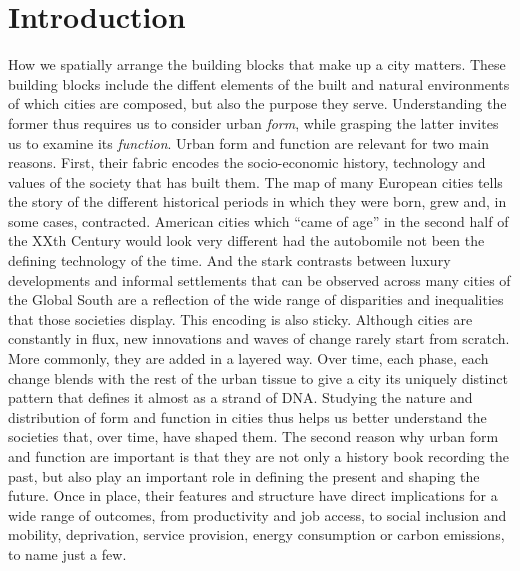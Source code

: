 \section{Introduction}
\label{sec:intro}

How we spatially arrange the building blocks that make up a city matters.
These building blocks include the diffent
elements of the built and natural environments of which cities are composed,
but also the purpose they serve.
Understanding the former thus requires us to consider urban \textit{form}, while
grasping the latter invites us to examine its \textit{function}.
Urban form and function are relevant for two main reasons. First, their fabric
encodes the socio-economic history, technology and values
of the society that has built them. 
%
The map of many European cities tells the story of the different historical
periods in which they were born, grew and, in some cases, contracted.
%
American cities which ``came of age'' in the second half of the XXth Century
would look very different had the autobomile not been the defining
technology of the time.
%
And the stark contrasts between luxury developments and informal settlements
that can be observed across many cities of the Global South are a reflection
of the wide range of disparities and inequalities that those societies
display.
%
This encoding is also sticky. Although cities are constantly in flux, new
innovations and waves of change rarely start from scratch. More commonly, they
are added in a layered way. Over time, each phase, each change blends with the rest
of the urban tissue to give a city its uniquely distinct pattern that defines
it almost as a strand of DNA.
%
Studying the nature and distribution
of form and function in cities thus helps us better understand the societies
that, over time, have shaped them.
The second reason why urban form and function are important is that they are
not only a history book recording the past, but also play an important role in
defining the present and shaping the future.
%
Once in place, their features and structure have direct implications for a
wide range of outcomes, from  productivity and job access, to social inclusion
and mobility, deprivation, service provision, energy consumption or carbon
emissions, to name just a few.


